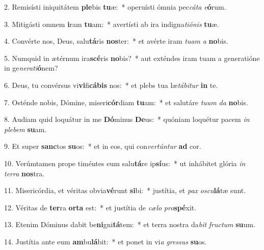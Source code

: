 2. Remisísti iniquitátem \textbf{ple}bis \textbf{tu}æ:~*  operuísti ómnia pec\textit{cá}\textit{ta} \textit{e}\textbf{ó}rum.\

3. Mitigásti omnem \textbf{i}ram \textbf{tu}am:~*  avertísti ab ira indigna\textit{ti}\textit{ó}\textit{nis} \textbf{tu}æ.\

4. Convérte nos, Deus, salu\textbf{tá}ris \textbf{nos}ter:~*  et avérte iram \textit{tu}\textit{am} \textit{a} \textbf{no}bis.\

5. Numquid in ætérnum ira\textbf{scé}ris \textbf{no}bis?~*  aut exténdes iram tuam a generatióne in ge\textit{ne}\textit{ra}\textit{ti}\textbf{ó}nem?\

6. Deus, tu convérsus vi\textbf{vi}fi\textbf{cá}\textbf{bis} nos:~*  et plebs tua læ\textit{tá}\textit{bi}\textit{tur} \textbf{in} te.\

7. Osténde nobis, Dómine, miseri\textbf{cór}diam \textbf{tu}am:~*  et salutáre \textit{tu}\textit{um} \textit{da} \textbf{no}bis.\

8. Audiam quid loquátur in me \textbf{Dó}minus \textbf{De}us:~*  quóniam loquétur pacem \textit{in} \textit{ple}\textit{bem} \textbf{su}am.\

9. Et super \textbf{sanc}tos \textbf{su}os:~*  et in eos, qui con\textit{ver}\textit{tún}\textit{tur} \textbf{ad} cor.\

10. Verúmtamen prope timéntes eum salu\textbf{tá}re ip\textbf{sí}us:~*  ut inhábitet glória \textit{in} \textit{ter}\textit{ra} \textbf{nos}tra.\

11. Misericórdia, et véritas obvia\textbf{vé}runt \textbf{si}bi:~*  justítia, et \textit{pax} \textit{os}\textit{cu}\textbf{lá}tæ sunt.\

12. Véritas de \textbf{ter}ra \textbf{or}\textbf{ta} est:~*  et justítia de \textit{cæ}\textit{lo} \textit{pro}\textbf{spé}xit.\

13. Etenim Dóminus dabit be\textbf{ni}gni\textbf{tá}tem:~*  et terra nostra da\textit{bit} \textit{fruc}\textit{tum} \textbf{su}um.\

14. Justítia ante eum \textbf{am}bu\textbf{lá}bit:~*  et ponet in vi\textit{a} \textit{gres}\textit{sus} \textbf{su}os.\

